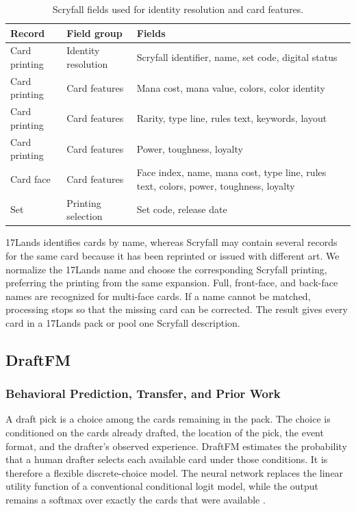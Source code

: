 \documentclass[11pt]{article}
\numberwithin{equation}{section}
\begin{document}
\begin{table}[tb]
\centering
\caption{Scryfall fields used for identity resolution and card features.}
\label{tab:scryfall-fields}
\begin{tabular}{L{0.18\textwidth}L{0.20\textwidth}L{0.52\textwidth}}
\toprule
Record & Field group & Fields \\
\midrule
Card printing & Identity resolution & Scryfall identifier, name, set code,
digital status \\
\addlinespace
Card printing & Card features & Mana cost, mana value, colors, color identity \\
\addlinespace
Card printing & Card features & Rarity, type line, rules text, keywords, layout \\
\addlinespace
Card printing & Card features & Power, toughness, loyalty \\
\addlinespace
Card face & Card features & Face index, name, mana cost, type line, rules
text, colors, power, toughness, loyalty \\
\addlinespace
Set & Printing selection & Set code, release date \\
\bottomrule
\end{tabular}
\end{table}

17Lands identifies cards by name, whereas Scryfall may contain several records
for the same card because it has been reprinted or issued with different art.
We normalize the 17Lands name and choose the corresponding Scryfall printing,
preferring the printing from the same expansion. Full, front-face, and
back-face names are recognized for multi-face cards. If a name cannot be
matched, processing stops so that the missing card can be corrected. The
result gives every card in a 17Lands pack or pool one Scryfall description.

\subsection{DraftFM}
\label{sec:draftfm}

\subsubsection{Behavioral Prediction, Transfer, and Prior Work}
\label{sec:behavioral-transfer}

A draft pick is a choice among the cards remaining in the pack. The choice is
conditioned on the cards already drafted, the
location of the pick, the event format, and the drafter's observed experience.
DraftFM estimates the probability that a human drafter selects each available
card under those conditions. It is therefore a flexible discrete-choice model.
The neural network replaces the linear utility function of a conventional
conditional logit model, while the output remains a softmax over exactly the
cards that were available \citep{mcfadden1974}.
\end{document}
